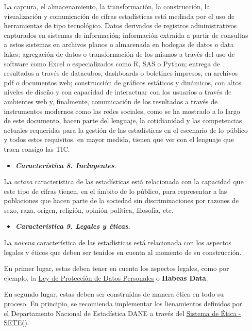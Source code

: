 \documentclass[
]{book}
\providecommand{\tightlist}{%
  \setlength{\itemsep}{0pt}\setlength{\parskip}{0pt}}
\begin{document}
La captura, el almacenamiento, la transformación, la construcción, la visualización y comunicación de cifras estadísticas está mediada por el uso de herramientas de tipo tecnológico. Datos derivados de registros administrativos capturados en sistemas de información; información extraída a partir de consultas a estos sistemas en archivos planos o almacenada en bodegas de datos o data lakes; agregación de datos o transformación de los mismos a través del uso de software como Excel o especializados como R, SAS o Python; entrega de resultados a través de datacubos, dashboards o boletines impresos, en archivos pdf o documentos web; construcción de gráficos estáticos y dinámicos, con altos niveles de diseño y con capacidad de interactuar con los usuarios a través de ambientes web y, finalmente, comunicación de los resultados a través de instrumentos modernos como las redes sociales, como se ha mostrado a lo largo de este documento, hacen parte del lenguaje, la cotidianidad y las competencias actuales requeridas para la gestión de las estadísticas en el escenario de lo público y todos estos requisitos, en mayor medida, tienen que ver con el lenguaje que traen consigo las TIC.

\begin{itemize}
\tightlist
\item
  \textbf{\emph{Característica 8. Incluyentes}}.
\end{itemize}

La \emph{octava} característica de las estadísticas está relacionada con la capacidad que este tipo de cifras tienen, en el ámbito de lo público, para representar a las poblaciones que hacen parte de la sociedad sin discriminaciones por razones de sexo, raza, origen, religión, opinión política, filosofía, etc.

\begin{itemize}
\tightlist
\item
  \textbf{\emph{Característica 9. Legales y éticas}}.
\end{itemize}

La \emph{novena} característica de las estadísticas está relacionada con los aspectos legales y éticos que deben ser tenidos en cuenta al momento de su construcción.

En primer lugar, estas deben tener en cuenta los aspectos legales, como por ejemplo, la \href{https://www.funcionpublica.gov.co/eva/gestornormativo/norma.php?i=49981}{Ley de Protección de Datos Personales} o \textbf{Habeas Data}.

En segundo lugar, estas deben ser construidas de manera ética en todo su proceso. En principio, se recomienda implementar los lienamientos definidos por el Departamento Nacional de Estadística DANE a través del \href{https://www.sen.gov.co/files/sen/Documento\%20Maestro\%20SETE.pdf}{Sistema de Ética - SETE}(\citet{SETE}).
\end{document}
